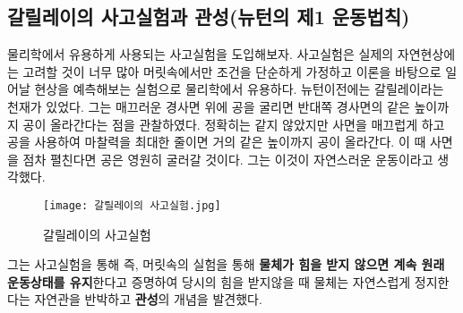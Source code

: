 \subsection{갈릴레이의 사고실험과 관성(뉴턴의 제1 운동법칙)}
물리학에서 유용하게 사용되는 사고실험을 도입해보자. 사고실험은 실제의 자연현상에는 고려할 것이 너무 많아 
머릿속에서만 조건을 단순하게 가정하고 이론을 바탕으로 일어날 현상을 예측해보는 실험으로 물리학에서 유용하다. 
뉴턴이전에는 갈릴레이라는 천재가 있었다. 그는 매끄러운 경사면 위에 공을 굴리면 반대쪽 경사면의 같은 높이까지 공이 올라간다는 
점을 관찰하였다. 정확히는 같지 않았지만 사면을 매끄럽게 하고 공을 사용하여 마찰력을 최대한 줄이면 거의 같은 높이까지 
공이 올라간다. 이 때 사면을 점차 펼친다면 공은 영원히 굴러갈 것이다. 그는 이것이 자연스러운 운동이라고 생각했다. 

\begin{figure}[h]
  \centering
   \texttt{[image: 갈릴레이의 사고실험.jpg]}
   \caption{갈릴레이의 사고실험}\label{fig:Galilei's thought}
 \end{figure}
그는 사고실험을 통해 즉, 머릿속의 실험을 통해 \textbf{물체가 힘을 받지 않으면 계속 원래 운동상태를 유지}한다고 증명하여 
당시의 힘을 받지않을 때 물체는 자연스럽게 정지한다는 자연관을 반박하고 \textbf{관성}의 개념을 발견했다. 


